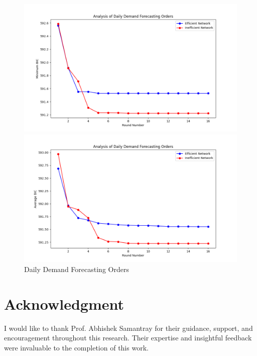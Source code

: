 \documentclass[conference]{IEEEtran}
\begin{document}
\begin{figure}[htbp]
\centerline{\includegraphics[scale=0.4]{figures/Daily Demand Forecasting Orders Min.png}}
\centerline{\includegraphics[scale=0.4]{figures/Daily Demand Forecasting Orders Avg.png}}
\caption{Daily Demand Forecasting Orders}
\label{fig}
\end{figure}

\section*{Acknowledgment}

I would like to thank Prof. Abhishek Samantray for their guidance, support, and encouragement throughout this research. Their expertise and insightful feedback were invaluable to the completion of this work.
\end{document}
